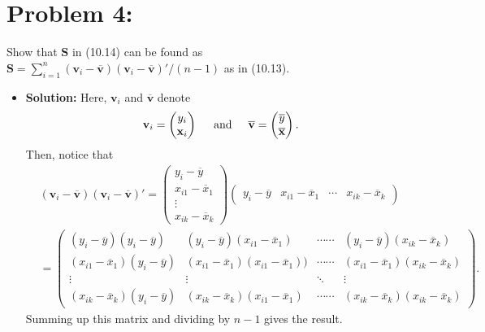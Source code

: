 \documentclass[11pt]{article}
\begin{document}
\section*{Problem 4:}
Show that $\mathbf{S}$ in (10.14) can be found as $\mathbf{S} = \sum_{i=1}^n (\mathbf{v}_i - \overline{\mathbf{v}})(\mathbf{v}_i - \overline{\mathbf{v}})' / (n-1)$ as in (10.13).
\begin{itemize}
\item[] \textbf{Solution:} Here, $\mathbf{v}_i$ and $\overline{\mathbf{v}}$ denote
\[
\mathbf{v}_i = \left(\begin{matrix}
y_i \\ \mathbf{x}_i
\end{matrix}\right) \hspace{5mm} \text{and} \hspace{5mm} \overline{\mathbf{v}} = \begin{pmatrix}
\overline{y} \\ \overline{\mathbf{x}}
\end{pmatrix}.
\]
Then, notice that
\begin{align*}
&(\mathbf{v}_i - \overline{\mathbf{v}}) (\mathbf{v}_i - \overline{\mathbf{v}})' = \begin{pmatrix}
y_i - \overline{y} \\ x_{i1} - \overline{x}_1 \\ \vdots \\ x_{ik} - \overline{x}_k 
\end{pmatrix} \begin{pmatrix}
y_i - \overline{y} & x_{i1} - \overline{x}_1 & \cdots & x_{ik} - \overline{x}_k
\end{pmatrix} \\
&= \begin{pmatrix}
(y_i - \overline{y})(y_i - \overline{y}) & (y_i - \overline{y})(x_{i1} - \overline{x}_1) & \cdots\cdots & (y_i - \overline{y})(x_{ik} - \overline{x}_k) \\
(x_{i1} - \overline{x}_1)(y_i - \overline{y}) & (x_{i1} - \overline{x}_1)(x_{i1} - \overline{x}_1)) & \cdots\cdots & (x_{i1} - \overline{x}_1)(x_{ik} - \overline{x}_k) \\
\vdots & \vdots & \ddots & \vdots \\
( x_{ik} - \overline{x}_k)(y_i - \overline{y}) & ( x_{ik} - \overline{x}_k)(x_{i1} - \overline{x}_1)& \cdots\cdots & ( x_{ik} - \overline{x}_k)( x_{ik} - \overline{x}_k)
\end{pmatrix}.
\end{align*}
Summing up this matrix and dividing by $n-1$ gives the result.
\end{itemize}
\end{document}
